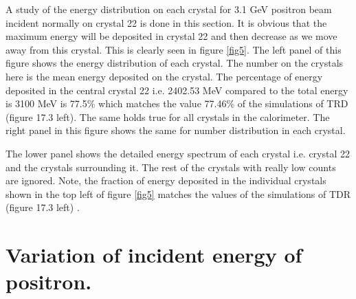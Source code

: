 \documentclass[article,accept,moreauthors,pdftex,10pt,a4paper]{../MDPI_template/Definitions/mdpi}
\begin{document}
\noindent 
A study of the energy distribution on each crystal for 3.1 GeV positron beam incident normally 
on crystal 22 is done in this section. It is obvious that the maximum 
energy will be deposited in crystal 22 and then decrease 
as we move away from this crystal. This is clearly seen in figure \ref{fig5}. 
The left panel of this figure shows the 
energy distribution of each crystal. The number on the crystals here is the mean energy deposited on the crystal. 
The percentage of energy deposited in the central crystal 22 i.e. 2402.53 MeV 
compared to the total energy is 3100 MeV is 77.5\% which matches the value 77.46\% 
of the simulations of TRD (figure 17.3 left). The same holds true for all crystals in the calorimeter. 
The right panel in this figure shows the same for number distribution in each crystal.

The lower panel shows the detailed energy spectrum of each crystal i.e. crystal 22 and the crystals surrounding it. 
The rest of the crystals with really low counts are ignored. 
Note, the fraction of energy deposited in the individual crystals shown in the top left of figure \ref{fig5} matches the values 
of the simulations of TDR (figure 17.3 left) \cite{c3}. 


\section{Variation of incident energy of positron.}

 
\end{document}

